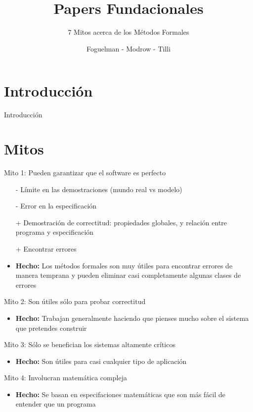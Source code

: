 \documentclass{beamer}
\title{Papers Fundacionales}
\subtitle{7 Mitos acerca de los M\'etodos Formales}
\author{Foguelman - Modrow - Tilli}
\institute{DC - UBA}
\begin{document}
\frame{\titlepage}
\section{Introducci\'on}
\begin{frame}{Introducci\'on}

\end{frame}

\section{Mitos}
\begin{frame}{Mito 1: Pueden garantizar que el software es perfecto }
\begin{itemize}[<+->]
\item[-] L\'imite en las demostraciones (mundo real vs modelo)
\item[-] Error en la especificaci\'on
\item[+] Demostraci\'on de correctitud: propiedades globales, y relaci\'on entre programa y especificaci\'on
\item[+] Encontrar errores
\item \textbf{Hecho:} Los m\'etodos formales son muy \'utiles para encontrar errores de manera temprana y pueden eliminar casi completamente algunas clases de errores
\end{itemize}
\end{frame}

\begin{frame}{Mito 2: Son \'utiles s\'olo para probar correctitud}
\begin{itemize}[<+->]
\item \textbf{Hecho:} Trabajan generalmente haciendo que pienses mucho sobre el sistema que pretendes construir
\end{itemize}
\end{frame}
 
\begin{frame}{Mito 3: S\'olo se benefician los sistemas altamente cr\'iticos} 
\begin{itemize}[<+->]
\item \textbf{Hecho:} Son \'utiles para casi cualquier tipo de aplicaci\'on
\end{itemize}
\end{frame}
 
\begin{frame}{Mito 4: Involucran matem\'atica compleja}
\begin{itemize}[<+->]
\item \textbf{Hecho:} Se basan en especifaciones matem\'aticas que son m\'as f\'acil de entender que un programa
\end{itemize}
\end{frame}
 
\end{document}
